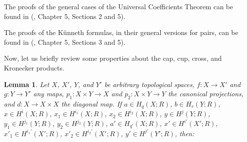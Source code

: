 \documentclass[12pt,oneside]{book}
\newtheorem{lem}    {Lemma}[chapter]
\begin{document}
    The proofs of the general cases of the Universal Coefficients Theorem can be found in (\cite{spanier}, 
    Chapter 5, Sections 2 and 5).
    
    The proofs of the Künneth formulas, in their general versions for pairs, can be found in 
    (\cite{spanier}, Chapter 5, Sections 3 and 5).
    
    Now, let us briefly review some properties about the cap, cup, 
    cross, and Kronecker products.

    \begin{lem}\label{propriedades_produtos}
        Let $X$, $X'$, $Y$, and $Y'$ be arbitrary topological spaces, $f:X\to X'$ and $g:Y\to Y'$ any 
        maps, $p_{1}:X\times Y\to X$ and $p_{2}:X\times Y\to Y$ the canonical projections, and 
        $d:X\to X\times X$ the diagonal map. If $a\in H_{q}(X;R)$, $b\in H_{r}(Y;R)$, 
        $x\in H^{i}(X;R)$, $x_{1}\in H^{i_{1}}(X;R)$, $x_{2}\in H^{i_{2}}(X;R)$, $y\in H^{j}(Y;R)$, 
        $y_{1}\in H^{j_{1}}(Y;R)$, $y_{2}\in H^{j_{2}}(Y;R)$, $a'\in H_{q'}(X;R)$, $x'\in H^{i'}(X';R)$, 
        $x'_{1}\in H^{i_{1}'}(X';R)$, $x'_{2}\in H^{i_{2}'}(X';R)$, $y'\in H^{j'}(Y';R)$, then:
    

\end{lem}
\end{document}
